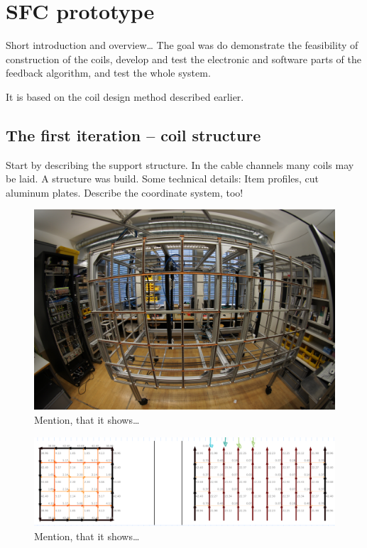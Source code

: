 \chapter{SFC prototype}
\label{ch:sfc-prototype}

Short introduction and overview\ldots
The goal was do demonstrate the feasibility of construction of the coils, develop and test the electronic and software parts of the feedback algorithm, and test the whole system.

It is based on the coil design method described earlier.


\section{The first iteration -- coil structure}
Start by describing the support structure. In the cable channels many coils may be laid. A structure was build. Some technical details: Item profiles, cut aluminum plates. Describe the coordinate system, too!

\begin{figure}
  \centering
  \includegraphics[width=0.9\linewidth]{gfx/prototype/DSC03472.JPG}
  \caption{Mention, that it shows\ldots}
  \label{fig:prototype_photo}
\end{figure}

\begin{figure}
  \centering
  \includegraphics[width=0.9\linewidth]{gfx/prototype/coil_y_currents.png}
  \caption{Mention, that it shows\ldots}
  \label{fig:prototype_coil_y_currents}
\end{figure}

